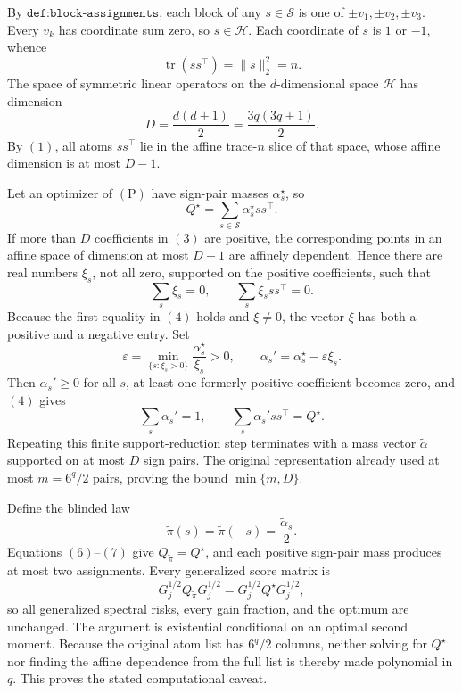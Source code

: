 By \(\texttt{def:block-assignments}\), each block of any \(s\in\mathscr S\) is one of \(\pm v_1,\pm v_2,\pm v_3\).  Every \(v_k\) has coordinate sum zero, so \(s\in\mathcal H\).  Each coordinate of \(s\) is \(1\) or \(-1\), whence
\[
\operatorname{tr}(ss^\top)=\lVert s\rVert_2^2=n.
\tag{1}
\]
The space of symmetric linear operators on the \(d\)-dimensional space \(\mathcal H\) has dimension
\[
D=\frac{d(d+1)}2=\frac{3q(3q+1)}2.
\tag{2}
\]
By \((1)\), all atoms \(ss^\top\) lie in the affine trace-\(n\) slice of that space, whose affine dimension is at most \(D-1\).

Let an optimizer of \((\mathrm P)\) have sign-pair masses \(\alpha_s^\star\), so
\[
Q^\star=\sum_{s\in\mathscr S}\alpha_s^\star ss^\top.
\tag{3}
\]
If more than \(D\) coefficients in \((3)\) are positive, the corresponding points in an affine space of dimension at most \(D-1\) are affinely dependent.  Hence there are real numbers \(\xi_s\), not all zero, supported on the positive coefficients, such that
\[
\sum_s\xi_s=0,
\qquad
\sum_s\xi_sss^\top=0.
\tag{4}
\]
Because the first equality in \((4)\) holds and \(\xi\ne0\), the vector \(\xi\) has both a positive and a negative entry.  Set
\[
\varepsilon=\min_{\{s:\xi_s>0\}}
\frac{\alpha_s^\star}{\xi_s}>0,
\qquad
\alpha_s'=\alpha_s^\star-\varepsilon\xi_s.
\tag{5}
\]
Then \(\alpha_s'\ge0\) for all \(s\), at least one formerly positive coefficient becomes zero, and \((4)\) gives
\[
\sum_s\alpha_s'=1,
\qquad
\sum_s\alpha_s'ss^\top=Q^\star.
\tag{6}
\]
Repeating this finite support-reduction step terminates with a mass vector \(\widetilde\alpha\) supported on at most \(D\) sign pairs.  The original representation already used at most \(m=6^q/2\) pairs, proving the bound \(\min\{m,D\}\).

Define the blinded law
\[
\widetilde\pi(s)=\widetilde\pi(-s)=\frac{\widetilde\alpha_s}{2}.
\tag{7}
\]
Equations \((6)\)--\((7)\) give \(Q_{\widetilde\pi}=Q^\star\), and each positive sign-pair mass produces at most two assignments.  Every generalized score matrix is
\[
G_j^{1/2}Q_{\widetilde\pi}G_j^{1/2}
=G_j^{1/2}Q^\star G_j^{1/2},
\]
so all generalized spectral risks, every gain fraction, and the optimum are unchanged.  The argument is existential conditional on an optimal second moment.  Because the original atom list has \(6^q/2\) columns, neither solving for \(Q^\star\) nor finding the affine dependence from the full list is thereby made polynomial in \(q\).  This proves the stated computational caveat.